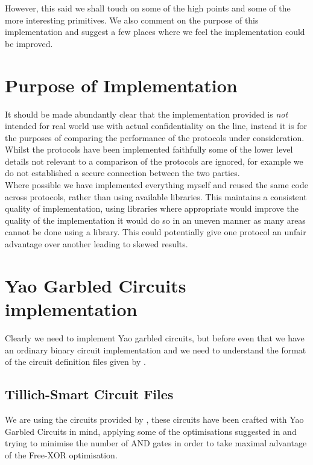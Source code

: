 \documentclass[ %
                    author={Nicholas Tutte},
                supervisor={Prof. Nigel Smart},
                    degree={MEng},
                     title={Secure Two Party Computation},
                  subtitle={A practical comparison of recent protocols},
                      type={Research - GG1K},
                      year={2015} ]{dissertation}
\begin{document}
\begin{appendices}
			However, this said we shall touch on some of the high points and some of the more interesting primitives. We also comment on the purpose of this implementation and suggest a few places where we feel the implementation could be improved.

			\section*{Purpose of Implementation}
				It should be made abundantly clear that the implementation provided is \emph{not} intended for real world use with actual confidentiality on the line, instead it is for the purposes of comparing the performance of the protocols under consideration.\\

				Whilst the protocols have been implemented faithfully some of the lower level details not relevant to a comparison of the protocols are ignored, for example we do not established a secure connection between the two parties.\\

				Where possible we have implemented everything myself and reused the same code across protocols, rather than using available libraries. This maintains a consistent quality of implementation, using libraries where appropriate would improve the quality of the implementation it would do so in an uneven manner as many areas cannot be done using a library. This could potentially give one protocol an unfair advantage over another leading to skewed results.

			\section{Yao Garbled Circuits implementation}

				Clearly we need to implement Yao garbled circuits, but before even that we have an ordinary binary circuit implementation and we need to understand the format of the circuit definition files given by \cite{NigelCircuits}.

				\subsection{Tillich-Smart Circuit Files}

					We are using the circuits provided by \cite{NigelCircuits}, these circuits have been crafted with Yao Garbled Circuits in mind, applying some of the optimisations suggested in \cite{SMC_Is_Practical} and trying to minimise the number of AND gates in order to take maximal advantage of the Free-XOR optimisation.\\


\end{appendices}
\end{document}
